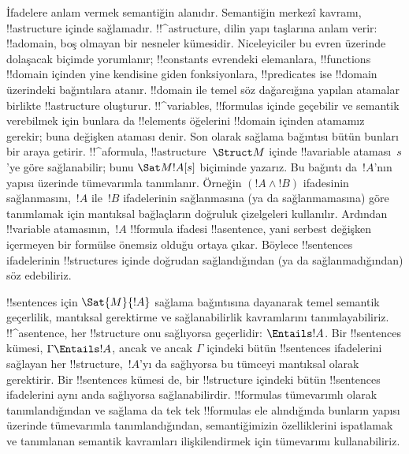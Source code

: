 



İfadelere anlam vermek semantiğin alanıdır. Semantiğin merkezî kavramı,
!!a{structure} içinde sağlamadır. !!^a{structure}, dilin yapı taşlarına
anlam verir: !!a{domain}, boş olmayan bir nesneler kümesidir.
Niceleyiciler bu evren üzerinde dolaşacak biçimde yorumlanır;
!!{constant}s evrendeki elemanlara, !!{function}s !!{domain} içinden
yine kendisine giden fonksiyonlara, !!{predicate}s ise !!{domain}
üzerindeki bağıntılara atanır. !!{domain} ile temel söz dağarcığına
yapılan atamalar birlikte !!a{structure} oluşturur. !!^{variable}s,
!!{formula}s içinde geçebilir ve semantik verebilmek için bunlara da
!!{element}s öğelerini !!{domain} içinden atamamız gerekir; buna
değişken ataması denir. Son olarak sağlama bağıntısı bütün bunları bir
araya getirir. !!^a{formula}, !!a{structure}~$\Struct M$ içinde
!!a{variable} ataması~$s$'ye göre sağlanabilir; bunu
$\Sat M{!A}[s]$ biçiminde yazarız. Bu bağıntı da~$!A$'nın yapısı
üzerinde tümevarımla tanımlanır. Örneğin $(!A\land !B)$ ifadesinin
sağlanmasını,~$!A$ ile~$!B$ ifadelerinin sağlanmasına (ya da
sağlanmamasına) göre tanımlamak için mantıksal bağlaçların doğruluk
çizelgeleri kullanılır. Ardından !!{variable} atamasının,~$!A$
!!{formula} ifadesi !!a{sentence}, yani serbest değişken içermeyen bir
formülse önemsiz olduğu ortaya çıkar. Böylece
!!{sentence}s ifadelerinin !!{structure}s içinde doğrudan sağlandığından
(ya da sağlanmadığından) söz edebiliriz.

!!{sentence}s için $\Sat{M}{!A}$ sağlama bağıntısına dayanarak temel
semantik geçerlilik, mantıksal gerektirme ve sağlanabilirlik
kavramlarını tanımlayabiliriz. !!^a{sentence}, her !!{structure} onu
sağlıyorsa geçerlidir: $\Entails !A$. Bir !!{sentence}s kümesi,
$\Gamma \Entails !A$, ancak ve ancak $\Gamma$ içindeki bütün
!!{sentence}s ifadelerini sağlayan her !!{structure},~$!A$'yı da
sağlıyorsa bu tümceyi mantıksal olarak gerektirir. Bir
!!{sentence}s kümesi de, bir !!{structure} içindeki bütün
!!{sentence}s ifadelerini aynı anda sağlıyorsa sağlanabilirdir.
!!{formula}s tümevarımlı olarak tanımlandığından ve sağlama da tek tek
!!{formula}s ele alındığında bunların yapısı üzerinde tümevarımla
tanımlandığından, semantiğimizin özelliklerini ispatlamak ve tanımlanan
semantik kavramları ilişkilendirmek için tümevarımı kullanabiliriz.

